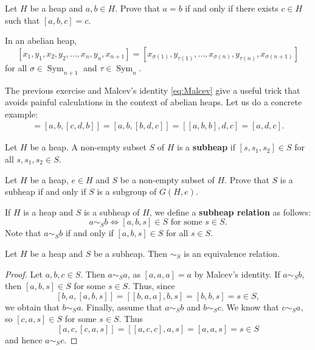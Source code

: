 \documentclass{svmult}
\newcommand{\Sym}{\operatorname{Sym}}
\begin{document}
\begin{exercise}
\label{xca:equality}
    Let $H$ be a heap and $a,b\in H$. Prove that
    $a=b$ if and only if there exists $c\in H$ such that 
    $[a,b,c]=c$.
\end{exercise}

\begin{exercise}
\label{xca:abelian}
    In an abelian heap,
    \[
    [x_1,y_1,x_2,y_2,\dots,x_n,y_n,x_{n+1}]=[x_{\sigma(1)},y_{\tau(1)},\dots,x_{\sigma(n)},y_{\tau(n)},x_{\sigma(n+1)}]
    \]
    for all $\sigma\in\Sym_{n+1}$ and $\tau\in\Sym_n$. 
\end{exercise}

The previous exercise and Malcev's identity \eqref{eq:Malcev}
give a useful trick that avoids painful calculations in the context of abelian heaps. 
Let us do a concrete example:
\begin{align*}
    [a,b,c,d,b]=[a,b,[c,d,b]]=[a,b,[b,d,c]]=[[a,b,b],d,c]=[a,d,c].
\end{align*}

\begin{definition}
    Let $H$ be a heap. 
    A non-empty subset $S$ of $H$ is a \textbf{subheap} if $[s,s_1,s_2]\in S$ for all 
    $s,s_1,s_2\in S$. 
\end{definition}

\begin{exercise}
    Let $H$ be a heap, $e\in H$ and $S$ be a non-empty subset of $H$. 
    Prove that $S$ is a subheap if and only if $S$ is a subgroup of $G(H,e)$. 
\end{exercise}

If $H$ is a heap and $S$ is a subheap of $H$, we define 
a \textbf{subheap relation} as follows:
\[
a\sim_S b\Longleftrightarrow [a,b,s]\in S\text{ for some $s\in S$}.
\]
Note that $a\sim_Sb$ if and only if $[a,b,s]\in S$ for all $s\in S$. 

\begin{proposition}
    Let $H$ be a heap and $S$ be a subheap. Then $\sim_S$ is an equivalence relation. 
\end{proposition}

\begin{proof}
    Let $a,b,c\in S$. Then $a\sim_S a$, as $[a,a,a]=a$ by Malcev's identity. 
    If $a\sim_S b$, then $[a,b,s]\in S$ for some $s\in S$. Thus, since 
    \[
    [b,a,[a,b,s]]=[[b,a,a],b,s]=[b,b,s]=s\in S,
    \]
    we obtain that $b\sim_S a$. 
    Finally, assume that $a\sim_S b$ and $b\sim_S c$. We know that 
    $c\sim_S a$, so 
    $[c,a,s]\in S$ for some $s\in S$. Thus 
    \[
    [a,c,[c,a,s]]=[[a,c,c],a,s]=[a,a,s]=s\in S
    \]
    and hence $a\sim_S c$. 
\end{proof}
\end{document}
